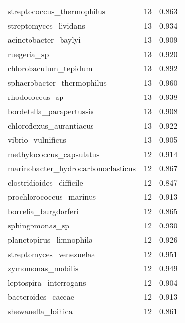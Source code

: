 \begin{tabular}{lrr}
                  streptococcus\_thermophilus &                  13 &     0.863 \\
                       streptomyces\_lividans &                  13 &     0.934 \\
                        acinetobacter\_baylyi &                  13 &     0.909 \\
                                 ruegeria\_sp &                  13 &     0.920 \\
                       chlorobaculum\_tepidum &                  13 &     0.892 \\
                  sphaerobacter\_thermophilus &                  13 &     0.960 \\
                              rhodococcus\_sp &                  13 &     0.938 \\
                    bordetella\_parapertussis &                  13 &     0.908 \\
                    chloroflexus\_aurantiacus &                  13 &     0.922 \\
                           vibrio\_vulnificus &                  13 &     0.905 \\
                    methylococcus\_capsulatus &                  12 &     0.914 \\
          marinobacter\_hydrocarbonoclasticus &                  12 &     0.867 \\
                    clostridioides\_difficile &                  12 &     0.847 \\
                     prochlorococcus\_marinus &                  12 &     0.913 \\
                        borrelia\_burgdorferi &                  12 &     0.865 \\
                             sphingomonas\_sp &                  12 &     0.930 \\
                     planctopirus\_limnophila &                  12 &     0.926 \\
                     streptomyces\_venezuelae &                  12 &     0.951 \\
                           zymomonas\_mobilis &                  12 &     0.949 \\
                      leptospira\_interrogans &                  12 &     0.904 \\
                          bacteroides\_caccae &                  12 &     0.913 \\
                          shewanella\_loihica &                  12 &     0.861 \\

\end{tabular}
